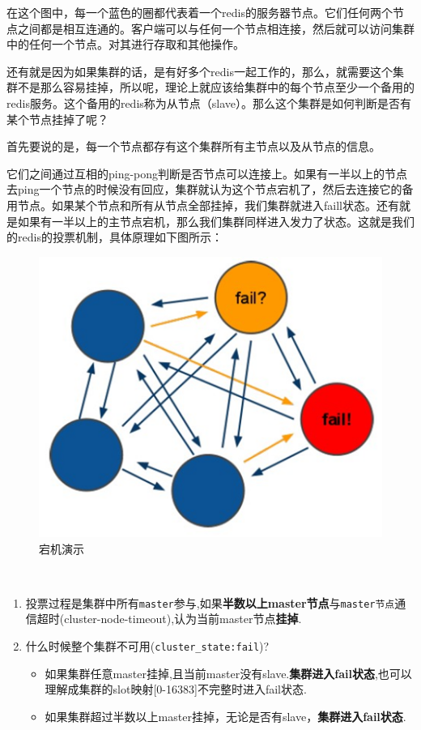 \documentclass[UTF8,a4paper,12pt]{ctexbook}
\begin{document}
		在这个图中，每一个蓝色的圈都代表着一个redis的服务器节点。它们任何两个节点之间都是相互连通的。客户端可以与任何一个节点相连接，然后就可以访问集群中的任何一个节点。对其进行存取和其他操作。
		
		还有就是因为如果集群的话，是有好多个redis一起工作的，那么，就需要这个集群不是那么容易挂掉，所以呢，理论上就应该给集群中的每个节点至少一个备用的redis服务。这个备用的redis称为从节点（slave）。那么这个集群是如何判断是否有某个节点挂掉了呢？
		
		首先要说的是，每一个节点都存有这个集群所有主节点以及从节点的信息。
			
		它们之间通过互相的ping-pong判断是否节点可以连接上。如果有一半以上的节点去ping一个节点的时候没有回应，集群就认为这个节点宕机了，然后去连接它的备用节点。如果某个节点和所有从节点全部挂掉，我们集群就进入faill状态。还有就是如果有一半以上的主节点宕机，那么我们集群同样进入发力了状态。这就是我们的redis的投票机制，具体原理如下图所示：
			\begin{figure}[H]
				\centering
				\includegraphics[scale=0.5]{failed}
				\caption{宕机演示}
			\end{figure}　	
		
		\begin{enumerate}
			\item 投票过程是集群中所有\verb|master|参与,如果\textbf{半数以上master节点}与\verb|master节点|通信超时(cluster-node-timeout),认为当前master节点\textbf{挂掉}.
			\item 什么时候整个集群不可用(\verb|cluster_state:fail|)?
				\begin{itemize}
					\item 如果集群任意master挂掉,且当前master没有slave.\textbf{集群进入fail状态},也可以理解成集群的slot映射[0-16383]不完整时进入fail状态. 
					\item 如果集群超过半数以上master挂掉，无论是否有slave，\textbf{集群进入fail状态}.
				\end{itemize}
		\end{enumerate}
			
\end{document}

